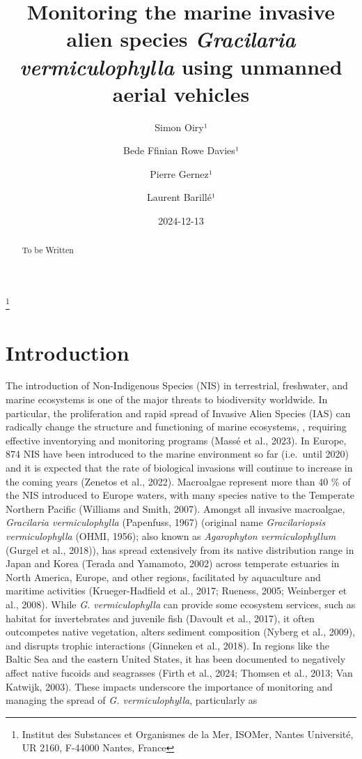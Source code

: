 \documentclass[
  letterpaper,
  DIV=11,
  numbers=noendperiod]{scrartcl}
\title{Monitoring the marine invasive alien species \emph{Gracilaria
vermiculophylla} using unmanned aerial vehicles}
\author{Simon Oiry¹ \and Bede Ffinian Rowe Davies¹ \and Pierre
Gernez¹ \and Laurent Barillé¹}
\date{2024-12-13}
\begin{document}
\maketitle
\begin{abstract}
To be Written
\end{abstract}


\footnote{Institut des Substances et Organismes de la Mer, ISOMer,
  Nantes Université, UR 2160, F-44000 Nantes, France}

\section{Introduction}\label{introduction}

The introduction of Non-Indigenous Species (NIS) in terrestrial,
freshwater, and marine ecosystems is one of the major threats to
biodiversity worldwide. In particular, the proliferation and rapid
spread of Invasive Alien Species (IAS) can radically change the
structure and functioning of marine ecosystems, , requiring effective
inventorying and monitoring programs (Massé et al., 2023). In Europe,
874 NIS have been introduced to the marine environment so far
(i.e.~until 2020) and it is expected that the rate of biological
invasions will continue to increase in the coming years (Zenetos et al.,
2022). Macroalgae represent more than 40 \% of the NIS introduced to
Europe waters, with many species native to the Temperate Northern
Pacific (Williams and Smith, 2007). Amongst all invasive macroalgae,
\emph{Gracilaria vermiculophylla} (Papenfuss, 1967) (original name
\emph{Gracilariopsis vermiculophylla} (OHMI, 1956); also known as
\emph{Agarophyton vermiculophyllum} (Gurgel et al., 2018)), has spread
extensively from its native distribution range in Japan and Korea
(Terada and Yamamoto, 2002) across temperate estuaries in North America,
Europe, and other regions, facilitated by aquaculture and maritime
activities (Krueger-Hadfield et al., 2017; Rueness, 2005; Weinberger et
al., 2008). While \emph{G. vermiculophylla} can provide some ecosystem
services, such as habitat for invertebrates and juvenile fish (Davoult
et al., 2017), it often outcompetes native vegetation, alters sediment
composition (Nyberg et al., 2009), and disrupts trophic interactions
(Ginneken et al., 2018). In regions like the Baltic Sea and the eastern
United States, it has been documented to negatively affect native
fucoids and seagrasses (Firth et al., 2024; Thomsen et al., 2013; Van
Katwijk, 2003). These impacts underscore the importance of monitoring
and managing the spread of \emph{G. vermiculophylla}, particularly as
\end{document}
